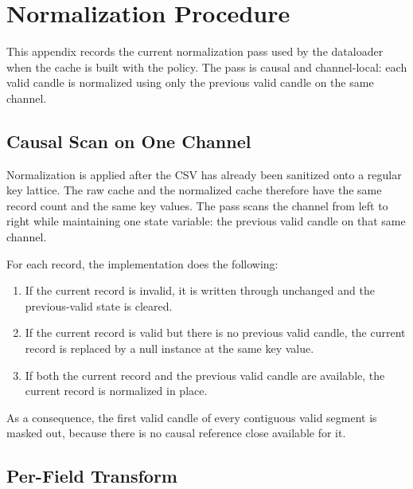 \section{Normalization Procedure}
\label{app:normalization}

This appendix records the current normalization pass used by the dataloader
when the cache is built with the  policy.  The pass is
causal and channel-local: each valid candle is normalized using only the
previous valid candle on the same channel.

\subsection{Causal Scan on One Channel}
\label{appsub:causal-scan-on-one-channel}

Normalization is applied after the CSV has already been sanitized onto a
regular key lattice.  The raw cache and the normalized cache therefore have the
same record count and the same key values.  The pass scans the channel from
left to right while maintaining one state variable: the previous valid candle
on that same channel.

For each record, the implementation does the following:
\begin{enumerate}
\item If the current record is invalid, it is written through unchanged and the
previous-valid state is cleared.
\item If the current record is valid but there is no previous valid candle, the
current record is replaced by a null instance at the same key value.
\item If both the current record and the previous valid candle are available,
the current record is normalized in place.
\end{enumerate}

As a consequence, the first valid candle of every contiguous valid segment is
masked out, because there is no causal reference close available for it.

\subsection{Per-Field Transform}
\label{appsub:per-field-transform}

